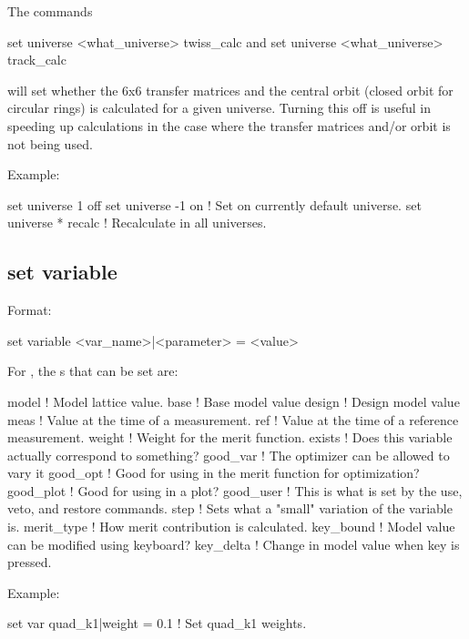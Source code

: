 {{{{{{{The commands
\begin{example}
  set universe <what_universe> twiss_calc  and
  set universe <what_universe> track_calc
\end{example}
will set whether the 6x6 transfer matrices and the central orbit (closed orbit for circular rings)
is calculated for a given universe. Turning this off is useful in speeding up calculations in the
case where the transfer matrices and/or orbit is not being used.

Example:
\begin{example}
  set universe 1 off
  set universe -1 on    ! Set on currently default universe.
  set universe * recalc ! Recalculate in all universes.
\end{example}


\subsection{set variable}
\label{s:set.variable}

Format:
\begin{example}
  set variable <var_name>|<parameter> = <value>
\end{example}

For , the s that can be set are:
\begin{example}
  model       ! Model lattice value.
  base        ! Base model value
  design      ! Design model value
  meas        ! Value at the time of a measurement.
  ref         ! Value at the time of a reference measurement.
  weight      ! Weight for the merit function.
  exists      ! Does this variable actually correspond to something?
  good_var    ! The optimizer can be allowed to vary it
  good_opt    ! Good for using in the merit function for optimization?
  good_plot   ! Good for using in a plot?
  good_user   ! This is what is set by the use, veto, and restore commands.
  step        ! Sets what a "small" variation of the variable is.
  merit_type  ! How merit contribution is calculated.
  key_bound   ! Model value can be modified using keyboard?
  key_delta   ! Change in model value when key is pressed.
\end{example}

Example:
\begin{example}
  set var quad_k1|weight = 0.1         ! Set quad_k1 weights. 
\end{example}

}}}}}}}

